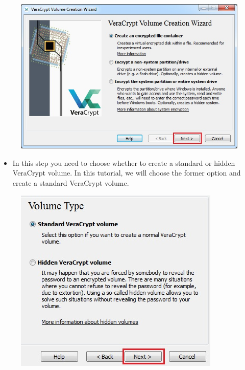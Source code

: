 \documentclass{tufte-handout}
\begin{document}
\begin{enumerate}
\begin{figure}
		\includegraphics[width=\linewidth]{img/vc_install_2.png}
	\end{figure}
	\FloatBarrier
	\begin{itemize}
		\item  In this step you need to choose whether to create a standard or hidden VeraCrypt volume. In this tutorial, we will choose the former option and create a standard VeraCrypt volume.
	\end{itemize}
	\begin{figure}
		\includegraphics[width=\linewidth]{img/vc_install_3.png}
	\end{figure}
	\FloatBarrier
	\begin{itemize}

\end{itemize}
\end{enumerate}
\end{document}
